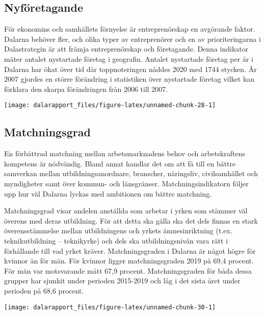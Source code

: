 \documentclass[
]{article}
\begin{document}
\hypertarget{nyfuxf6retagande}{%
\subsection{Nyföretagande}\label{nyfuxf6retagande}}

För ekonomins och samhällets förnyelse är entreprenörskap en avgörande
faktor. Dalarna behöver fler, och olika typer av entreprenörer och en av
prioriteringarna i Dalastrategin är att främja entreprenörskap och
företagande. Denna indikator mäter antalet nystartade företag i
geografin. Antalet nystartade företag per år i Dalarna har ökat över tid
där toppnoteringen nåddes 2020 med 1744 stycken. År 2007 gjordes en
större förändring i statistiken över nystartade företag vilket kan
förklara den skarpa förändringen från 2006 till 2007.

\begin{center}\texttt{[image: dalarapport\_files/figure-latex/unnamed-chunk-28-1]} \end{center}

\hypertarget{matchningsgrad}{%
\subsection{Matchningsgrad}\label{matchningsgrad}}

En förbättrad matchning mellan arbetsmarknadens behov och arbetskraftens
kompetens är nödvändig. Bland annat handlar det om att få till en bättre
samverkan mellan utbildningsanordnare, branscher, näringsliv,
civilsamhället och myndigheter samt över kommun- och länsgränser.
Matchningsindikatorn följer upp hur väl Dalarna lyckas med ambitionen om
bättre matchning.

Matchningsgrad visar andelen anställda som arbetar i yrken som stämmer
väl överens med deras utbildning. För att detta ska gälla ska det dels
finnas en stark överensstämmelse mellan utbildningens och yrkets
ämnesinriktning (t.ex. teknikutbildning -- teknikyrke) och dels ska
utbildningsnivån vara rätt i förhållande till vad yrket kräver.
Matchningsgraden i Dalarna är något högre för kvinnor än för män. För
kvinnor ligger matchningsgraden 2019 på 69,4 procent. För män var
motsvarande mått 67,9 procent. Matchningsgraden för båda dessa grupper
har sjunkit under perioden 2015-2019 och låg i det sista året under
perioden på 68,6 procent.

\begin{center}\texttt{[image: dalarapport\_files/figure-latex/unnamed-chunk-30-1]} \end{center}
\end{document}
